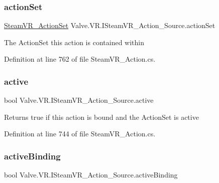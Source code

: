 \subsubsection{\texorpdfstring{actionSet}{actionSet}}
{\footnotesize\ttfamily \mbox{\hyperlink{class_valve_1_1_v_r_1_1_steam_v_r___action_set}{Steam\+V\+R\+\_\+\+Action\+Set}} Valve.\+V\+R.\+I\+Steam\+V\+R\+\_\+\+Action\+\_\+\+Source.\+action\+Set\hspace{0.3cm}{\ttfamily [get]}}



The Action\+Set this action is contained within 



Definition at line 762 of file Steam\+V\+R\+\_\+\+Action.\+cs.

\mbox{\label{interface_valve_1_1_v_r_1_1_i_steam_v_r___action___source_a529749f5fa62c29a4faac767cd9ece8d}} 
\subsubsection{\texorpdfstring{active}{active}}
{\footnotesize\ttfamily bool Valve.\+V\+R.\+I\+Steam\+V\+R\+\_\+\+Action\+\_\+\+Source.\+active\hspace{0.3cm}{\ttfamily [get]}}



Returns true if this action is bound and the Action\+Set is active 



Definition at line 744 of file Steam\+V\+R\+\_\+\+Action.\+cs.

\mbox{\label{interface_valve_1_1_v_r_1_1_i_steam_v_r___action___source_a304d2c626023c9dea73f4289c57975b3}} 
\subsubsection{\texorpdfstring{activeBinding}{activeBinding}}
{\footnotesize\ttfamily bool Valve.\+V\+R.\+I\+Steam\+V\+R\+\_\+\+Action\+\_\+\+Source.\+active\+Binding\hspace{0.3cm}{\ttfamily [get]}}



